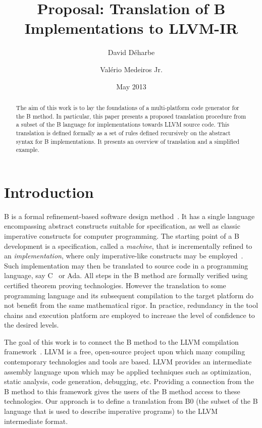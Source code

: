 \documentclass{llncs}
\title{Proposal: Translation of B Implementations to LLVM-IR}
\author{David D\'{e}harbe \inst{1} \and Val\'{e}rio Medeiros Jr.\inst{2}}
\institute{Federal University of Rio Grande do Norte, UFRN, Brazil\\
\and 
Federal Institute of Education, Science and Technology  of Rio Grande do Norte, IFRN, Brazil}
\date{May 2013}
\begin{document}
\maketitle

\begin{abstract}
The aim of this work is to lay the foundations of a multi-platform code
generator for the B method. In particular, this paper presents a proposed
translation  procedure from a subset of the B language for implementations
towards LLVM source code. This translation is defined formally as a set of
rules defined recursively on the abstract syntax for B implementations. It 
presents an overview of translation and a simplified example.
\end{abstract}

\section{Introduction}

B is a formal refinement-based software design method~\cite{Abrial1996}. It has
a single language encompassing abstract constructs suitable for specification,
as well as classic imperative constructs for computer programming. The starting
point of a B development is a specification, called a \emph{machine}, that is
incrementally refined to an \emph{implementation}, where only imperative-like
constructs may be employed~\cite{Clearsy}. Such implementation may then be
translated to source code in a programming language, say C~\cite{ComenC} or
Ada. All steps in the B method are formally verified using certified theorem
proving technologies. However the translation to some programming language and
its subsequent compilation to the target platform do not benefit from the same
mathematical rigor. In practice, redundancy in the tool chains and execution
platform are employed to increase the level of confidence to the desired levels.

The goal of this work is to connect the B method to the LLVM compilation
framework~\cite{Lattner04LLVM}.  LLVM is a free, open-source project upon which
many compiling contemporary technologies and tools are based. LLVM provides an
intermediate assembly language upon which may be applied techniques such as
optimization, static analysis, code generation, debugging, etc. Providing a
connection from the B method to this framework gives the users of the B method
access to these technologies. Our approach is to define a translation from B0
(the subset of the B language that is used to describe imperative programs) to
the LLVM intermediate format.
\end{document}
